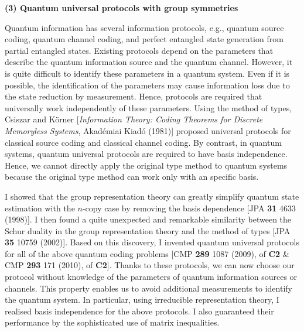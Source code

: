 \textbf{(3) Quantum universal protocols with group symmetries}

Quantum information has several information protocols, e.g., quantum source coding, quantum channel coding, and perfect entangled state generation from partial entangled states. 
Existing protocols depend on the parameters that describe the quantum information source and the quantum channel. 
However, it is quite difficult to identify these parameters in a quantum system.
Even if it is possible, the identification of the parameters may cause information loss due to the state reduction by measurement. 
Hence, protocols are required that universally work independently of these parameters. 
Using the method of types, 
Csiszar and K\"{o}rner [\emph{Information Theory: Coding Theorems for Discrete Memoryless Systems}, Akad\'emiai Kiad\'o (1981)]
proposed universal protocols for classical source coding and classical channel coding. 
By contrast, in quantum systems, quantum universal protocols are required to have basis independence.
Hence, we cannot directly apply the original type method to quantum systems because 
the original type method can work only with an specific basis.

I showed that the group representation theory can greatly simplify 
quantum state estimation with the $n$-copy case
by removing the basis dependence
[JPA \textbf{31} 4633 (1998)]. %
I then found a quite unexpected and remarkable similarity between the Schur duality in the group representation theory and the method of types
[JPA \textbf{35} 10759 (2002)]. %
Based on this discovery, I invented quantum universal protocols for all of the above quantum coding problems 
[CMP \textbf{289} 1087 (2009), \cite{Ha09-4} of \textbf{C2} \& %
CMP \textbf{293} 171 (2010), \cite{Ha09-7} of \textbf{C2}]. %
Thanks to these protocols, we can now choose our protocol without knowledge of the parameters of 
quantum information sources or channels. 
This property enables us to avoid additional measurements to identify the quantum system. 
In particular, using irreducible representation theory, I realised basis independence for the above protocols. 
I also guaranteed their performance by the sophisticated use of matrix inequalities.

